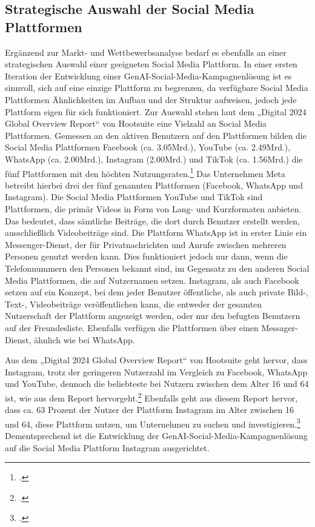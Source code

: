 \subsection{Strategische Auswahl der Social Media Plattformen}
Ergänzend zur Markt- und Wettbewerbsanalyse bedarf es ebenfalls an einer strategischen Auswahl einer geeigneten Social Media Plattform.
In einer ersten Iteration der Entwicklung einer GenAI-Social-Media-Kampagnenlösung ist es sinnvoll, sich auf eine einzige Plattform zu begrenzen, da verfügbare Social Media Plattformen Ähnlichkeiten im Aufbau und der Struktur aufweisen, jedoch jede Plattform eigen für sich funktioniert.
Zur Auswahl stehen laut dem „Digital 2024 Global Overview Report“ von Hootsuite eine Vielzahl an Social Media Plattformen.
Gemessen an den aktiven Benutzern auf den Plattformen bilden die Social Media Plattformen Facebook (ca. 3.05Mrd.), YouTube (ca. 2.49Mrd.), WhatsApp (ca. 2.00Mrd.), Instagram (2.00Mrd.) und TikTok (ca. 1.56Mrd.) die fünf Plattformen mit den höchten Nutzungsraten.\footcite{hootsuite_digital_2024_page_232}
Das Unternehmen Meta betreibt hierbei drei der fünf genannten Plattformen (Facebook, WhatsApp und Instagram).
Die Social Media Plattformen YouTube und TikTok sind Plattformen, die primär Videos in Form von Lang- und Kurzformaten anbieten.
Das bedeutet, dass sämtliche Beiträge, die dort durch Benutzer erstellt werden, ausschließlich Videobeiträge sind.
Die Plattform WhatsApp ist in erster Linie ein Messenger-Dienst, der für Privatnachrichten und Anrufe zwischen mehreren Personen genutzt werden kann.
Dies funktioniert jedoch nur dann, wenn die Telefonnummern den Personen bekannt sind, im Gegensatz zu den anderen Social Media Plattformen, die auf Nutzernamen setzen.
Instagram, als auch Facebook setzen auf ein Konzept, bei dem jeder Benutzer öffentliche, als auch private Bild-, Text-, Videobeiträge veröffentlichen kann, die entweder der gesamten Nutzerschaft der Plattform angezeigt werden, oder nur den befugten Benutzern auf der Freundesliste.
Ebenfalls verfügen die Plattformen über einen Messager-Dienst, ähnlich wie bei WhatsApp.

Aus dem „Digital 2024 Global Overview Report“ von Hootsuite geht hervor, dass Instagram, trotz der geringeren Nutzerzahl im Vergleich zu Facebook, WhatsApp und YouTube, dennoch die beliebteste bei Nutzern zwischen dem Alter 16 und 64 ist, wie aus dem Report hervorgeht.\footcite{hootsuite_digital_2024_page_236}
Ebenfalls geht aus diesem Report hervor, dass ca. 63 Prozent der Nutzer der Plattform Instagram im Alter zwischen 16 und 64, diese Plattform nutzen, um Unternehmen zu suchen und investigieren.\footcite{hootsuite_digital_2024_page_250}
Dementsprechend ist die Entwicklung der GenAI-Social-Media-Kampagnenlösung auf die Social Media Plattform Instagram ausgerichtet.

